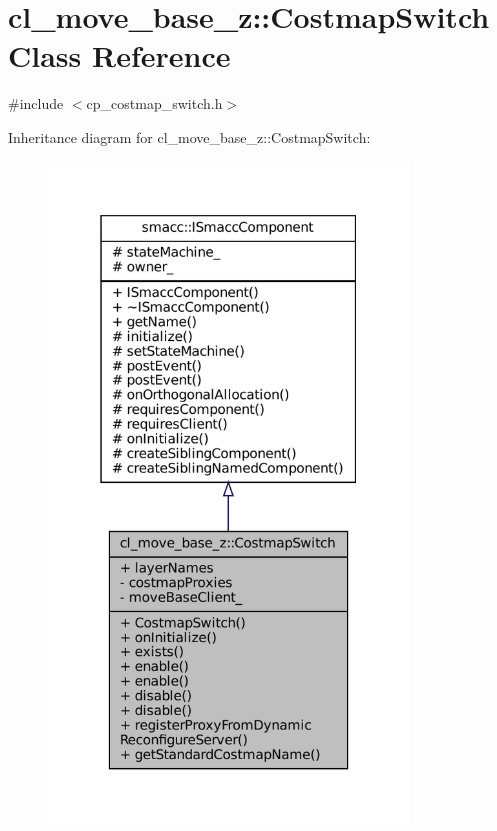 \hypertarget{classcl__move__base__z_1_1CostmapSwitch}{}\section{cl\+\_\+move\+\_\+base\+\_\+z\+:\+:Costmap\+Switch Class Reference}
\label{classcl__move__base__z_1_1CostmapSwitch}


{\ttfamily \#include $<$cp\+\_\+costmap\+\_\+switch.\+h$>$}



Inheritance diagram for cl\+\_\+move\+\_\+base\+\_\+z\+:\+:Costmap\+Switch\+:
\nopagebreak
\begin{figure}[H]
\begin{center}
\leavevmode
\includegraphics[width=271pt]{classcl__move__base__z_1_1CostmapSwitch__inherit__graph}
\end{center}
\end{figure}


